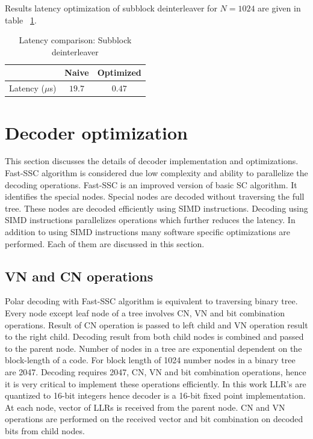 Results latency optimization of subblock deinterleaver for $N = 1024$ are given in table ~\ref{tab:subblockDeinterleaverLatency}.
\begin{table}[!h]
	\begin{center}
		\caption{Latency comparison: Subblock deinterleaver}
		\label{tab:subblockDeinterleaverLatency}
		\begin{tabular}{c|c|c} %
			\textbf{ } & Naive & Optimized \\
			\hline
			Latency ($\mu$s) & $19.7$ & $0.47$\\
		\end{tabular}
	\end{center}
\end{table}

\section{Decoder optimization}
This section discusses the details of decoder implementation and optimizations. Fast-SSC algorithm is considered due low complexity and ability to parallelize the decoding operations. Fast-SSC is an improved version of basic SC algorithm. It identifies the special nodes. Special nodes are decoded without traversing the full tree. These nodes are decoded efficiently using SIMD instructions. Decoding using SIMD instructions parallelizes operations which further reduces the latency. In addition to using SIMD instructions many software specific optimizations are performed. Each of them are discussed in this section.

\subsection{VN and CN operations}
Polar decoding with Fast-SSC algorithm is equivalent to traversing binary tree. Every node except leaf node of a tree involves CN, VN and bit combination operations. Result of CN operation is passed to left child and VN operation result to the right child. Decoding result from both child nodes is combined and passed to the parent node. Number of nodes in a tree are exponential dependent on the block-length of a code. For block length of 1024 number nodes in a binary tree are 2047. Decoding requires 2047, CN, VN and bit combination operations, hence it is very critical to implement these operations efficiently. In this work LLR's are quantized to 16-bit integers hence decoder is a 16-bit fixed point implementation. At each node, vector of LLRs is received from the parent node. CN and VN operations are performed on the received vector and bit combination on decoded bits from child nodes.

